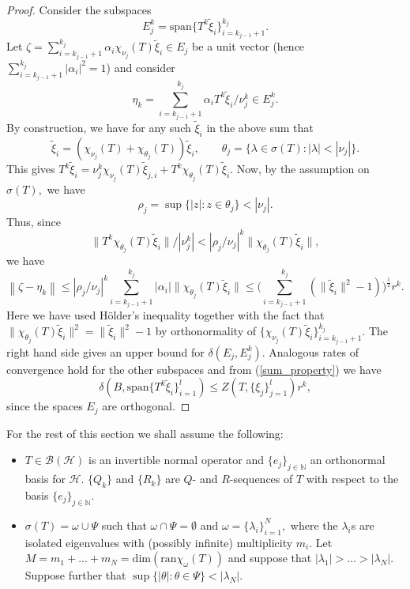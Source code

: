 \documentclass[a4paper,10pt]{article}
\begin{document}
\begin{proof}
Consider the subspaces
$$
E_j^k = \mathrm{span}\{T^k
\tilde \xi_{i}\}_{i=k_{j-1}+1}^{k_j}.
$$
Let $\zeta = \sum_{i=k_{j-1}+1}^{k_j} \alpha_i\chi_{\nu_j}(T)\tilde\xi_{i}\in E_j$ be a unit vector (hence $\sum_{i=k_{j-1}+1}^{k_j}\left|\alpha_i\right|^2=1$) and consider
$$
\eta_k = \sum_{i=k_{j-1}+1}^{k_j} \alpha_iT^k\tilde\xi_{i}/\nu^k_j\in E_j^k.
$$
By construction, we have for any such $\tilde\xi_{i}$ in the above sum that
$$
\tilde\xi_{i} = (\chi_{\nu_j}(T) + \chi_{\theta_j}(T))\tilde\xi_{i},
\qquad  
\theta_j = \{\lambda \in \sigma(T) : 
|\lambda| < |\nu_j|\}.
$$     
This gives $T^k\tilde\xi_{i} = \nu^k_j\chi_{\nu_j}(T)\tilde\xi_{j,i} 
 + T^k\chi_{\theta_j}(T)\tilde\xi_{i}.$ Now, by the assumption on $\sigma(T),$ we have 
\[
\rho_j = \sup\{|z|: z \in
  \theta_j\} < |\nu_j|.
\] Thus, since 
\[
\|T^k \chi_{\theta_j}(T)\tilde\xi_{i}\|/|\nu_j^k| < 
|\rho_j/\nu_j|^k \|\chi_{\theta_j}(T)\tilde\xi_{i}\|,
\]
we have 
$$
\left\|\zeta-\eta_k\right\|\leq |\rho_j/\nu_j|^k\sum_{i=k_{j-1}+1}^{k_j} \left|\alpha_i\right|\|\chi_{\theta_j}(T)\tilde\xi_{i}\|\leq \Big(\sum_{i=k_{j-1}+1}^{k_j}(\|\tilde\xi_i\|^2-1)\Big)^{\frac{1}{2}}r^k.
$$
Here we have used H{\"o}lder's inequality together with the fact that $\|\chi_{\theta_j}(T)\tilde\xi_{i}\|^2=\|\tilde\xi_{i}\|^2-1$ by orthonormality of $\{\chi_{\nu_j}(T)\tilde\xi_i\}_{i=k_{j-1}+1}^{k_j}$. The right hand side gives an upper bound for $\delta(E_j,E_j^k)$. Analogous rates of convergence hold for the other subspaces and from (\ref{sum_property}) we have
\begin{equation}
\label{perp_argument}
\delta(B,\mathrm{span}\{T^k\tilde\xi_i\}_{i=1}^l)\leq Z(T,\{\xi_j\}_{j=1}^l)r^k,
\end{equation}
since the spaces $E_j$ are orthogonal.
\end{proof}

For the rest of this section we shall assume the following:
\vspace{2mm}
\begin{tcolorbox}
\begin{itemize}
	\item[(A1)] $T \in \mathcal{B}(\mathcal{H})$ is an invertible normal operator and $\{e_j\}_{j\in\mathbb{N}}$ an orthonormal basis for $\mathcal{H}$. $\{Q_k\}$ and $\{R_k\}$ are $Q$- and $R$-sequences of $T$ with respect to the basis $\{e_j\}_{j\in\mathbb{N}}.$
	\item[(A2)] $\sigma(T) = \omega \cup \Psi$
such that $\omega \cap \Psi = \emptyset$ and $\omega =\{\lambda_i\}_{i=1}^N,$ where the $\lambda_i$s are isolated eigenvalues with (possibly infinite) multiplicity $m_i$. Let $M=m_1+...+m_N=\mathrm{dim}(\mathrm{ran}\chi_{\omega}(T))$ and suppose that $|\lambda_1| > \hdots > |\lambda_N|.$ Suppose further that $\sup\{|\theta|:\theta \in \Psi\} < |\lambda_N|.$ 
\end{itemize}
\end{tcolorbox}
\vspace{2mm}
\end{document}
